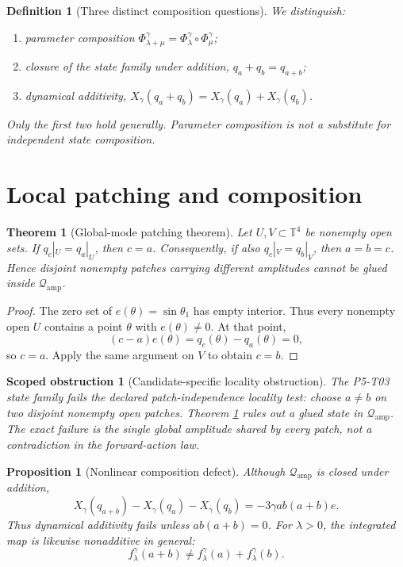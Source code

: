 \documentclass[11pt]{article}
\newcommand{\Qamp}{\mathcal Q_{\mathrm{amp}}}
\newtheorem{definition}{Definition}
\newtheorem{theorem}{Theorem}
\newtheorem{proposition}{Proposition}
\newtheorem{obstruction}{Scoped obstruction}
\begin{document}
\begin{definition}[Three distinct composition questions]
We distinguish:
\begin{enumerate}
 \item parameter composition
 \(\Phi^\gamma_{\lambda+\mu}
 =\Phi^\gamma_\lambda\circ\Phi^\gamma_\mu\);
 \item closure of the state family under addition,
 \(q_a+q_b=q_{a+b}\);
 \item dynamical additivity,
 \(X_\gamma(q_a+q_b)=X_\gamma(q_a)+X_\gamma(q_b)\).
\end{enumerate}
Only the first two hold generally.  Parameter composition is not a substitute
for independent state composition.
\end{definition}

\section{Local patching and composition}

\begin{theorem}[Global-mode patching theorem]
\label{thm:patching}
Let \(U,V\subset\mathbb T^4\) be nonempty open sets.  If
\(q_c|_U=q_a|_U\), then \(c=a\).  Consequently, if also
\(q_c|_V=q_b|_V\), then \(a=b=c\).  Hence disjoint nonempty patches carrying
different amplitudes cannot be glued inside \(\Qamp\).
\end{theorem}

\begin{proof}
The zero set of \(e(\theta)=\sin\theta_1\) has empty interior.  Thus every
nonempty open \(U\) contains a point \(\theta\) with \(e(\theta)\neq0\).
At that point,
\[
 (c-a)e(\theta)=q_c(\theta)-q_a(\theta)=0,
\]
so \(c=a\).  Apply the same argument on \(V\) to obtain \(c=b\).
\end{proof}

\begin{obstruction}[Candidate-specific locality obstruction]
\label{obs:locality}
The P5-T03 state family fails the declared patch-independence locality test:
choose \(a\neq b\) on two disjoint nonempty open patches.  Theorem
\ref{thm:patching} rules out a glued state in \(\Qamp\).  The exact failure is
the single global amplitude shared by every patch, not a contradiction in
the forward-action law.
\end{obstruction}

\begin{proposition}[Nonlinear composition defect]
\label{prop:additivity}
Although \(\Qamp\) is closed under addition,
\[
 X_\gamma(q_{a+b})-X_\gamma(q_a)-X_\gamma(q_b)
 =-3\gamma ab(a+b)e.
 \label{eq:generator-defect}
\]
Thus dynamical additivity fails unless \(ab(a+b)=0\).  For
\(\lambda>0\), the integrated map is likewise nonadditive in general:
\[
 f^\gamma_\lambda(a+b)\neq
 f^\gamma_\lambda(a)+f^\gamma_\lambda(b).
\]
\end{proposition}
\end{document}
